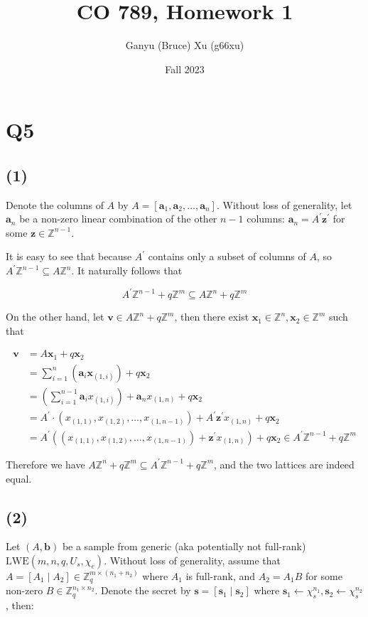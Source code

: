 \documentclass{article}
\title{CO 789, Homework 1}
\author{Ganyu (Bruce) Xu (g66xu)}
\date{Fall 2023}
\begin{document}

\section*{Q5}
\subsection*{(1)}
Denote the columns of $A$ by $A = [\mathbf{a}_1, \mathbf{a}_2, \ldots, \mathbf{a}_n]$. Without loss of generality, let $\mathbf{a}_n$ be a non-zero linear combination of the other $n-1$ columns: $\mathbf{a}_n = A^\prime \mathbf{z}^\prime$ for some $\mathbf{z} \in \mathbb{Z}^{n-1}$.

It is easy to see that because $A^\prime$ contains only a subset of columns of $A$, so $A^\prime\mathbb{Z}^{n-1} \subseteq A\mathbb{Z}^n$. It naturally follows that

$$
A^\prime\mathbb{Z}^{n-1} + q\mathbb{Z}^m \subseteq A\mathbb{Z}^n + q\mathbb{Z}^m
$$


On the other hand, let $\mathbf{v} \in A \mathbb{Z}^{n} + q\mathbb{Z}^m$, then there exist $\mathbf{x}_1 \in \mathbb{Z}^n, \mathbf{x}_2 \in \mathbb{Z}^m$ such that 

$$
\begin{aligned}
\mathbf{v} &= A\mathbf{x}_1 + q\mathbf{x}_2 \\
&= \sum_{i=1}^n(\mathbf{a}_i \mathbf{x}_{(1, i)}) + q\mathbf{x}_2 \\
&= (\sum_{i=1}^{n-1}\mathbf{a}_i x_{(1, i)}) + \mathbf{a}_n x_{(1, n)} + q\mathbf{x}_2 \\
&= A^\prime \cdot (x_{(1, 1)}, x_{(1, 2)}, \ldots, x_{(1, n-1)}) + A^\prime\mathbf{z}^\prime x_{(1, n)} + q\mathbf{x}_2 \\
&= A^\prime((x_{(1, 1)}, x_{(1, 2)}, \ldots, x_{(1, n-1)}) + \mathbf{z}^\prime x_{(1, n)}) + q\mathbf{x}_2 \in A^\prime\mathbb{Z}^{n-1} + q\mathbb{Z}^m
\end{aligned}
$$

Therefore we have $A\mathbb{Z}^{n} + q\mathbb{Z}^m \subseteq A^\prime\mathbb{Z}^{n-1} + q\mathbb{Z}^m$, and the two lattices are indeed equal.

\subsection*{(2)}
Let $(A, \mathbf{b})$ be a sample from generic (aka potentially not full-rank) $\text{LWE}(m, n, q, U_s, \chi_e)$. Without loss of generality, assume that $A = [A_1 \mid A_2] \in \mathbb{Z}_q^{m \times (n_1 + n_2)}$ where $A_1$ is full-rank, and $A_2 = A_1B$ for some non-zero $B \in \mathbb{Z}_q^{n_1 \times n_2}$. Denote the secret by $\mathbf{s} = [\mathbf{s}_1 \mid \mathbf{s}_2]$ where $\mathbf{s}_1 \leftarrow \chi_s^{n_1}, \mathbf{s}_2 \leftarrow \chi_s^{n_2}$, then:
\end{document}
